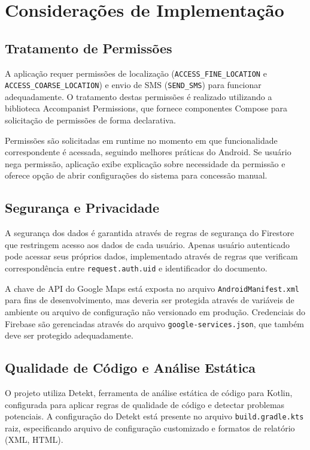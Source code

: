 \section{Considerações de Implementação}
\subsection{Tratamento de Permissões}
A aplicação requer permissões de localização (\texttt{ACCESS\_FINE\_LOCATION} e \texttt{ACCESS\_COARSE\_LOCATION}) e envio de SMS (\texttt{SEND\_SMS}) para funcionar adequadamente. O tratamento destas permissões é realizado utilizando a biblioteca Accompanist Permissions, que fornece componentes Compose para solicitação de permissões de forma declarativa.

Permissões são solicitadas em runtime no momento em que funcionalidade correspondente é acessada, seguindo melhores práticas do Android. Se usuário nega permissão, aplicação exibe explicação sobre necessidade da permissão e oferece opção de abrir configurações do sistema para concessão manual.

\subsection{Segurança e Privacidade}
A segurança dos dados é garantida através de regras de segurança do Firestore que restringem acesso aos dados de cada usuário. Apenas usuário autenticado pode acessar seus próprios dados, implementado através de regras que verificam correspondência entre \texttt{request.auth.uid} e identificador do documento.

A chave de API do Google Maps está exposta no arquivo \texttt{AndroidManifest.xml} para fins de desenvolvimento, mas deveria ser protegida através de variáveis de ambiente ou arquivo de configuração não versionado em produção. Credenciais do Firebase são gerenciadas através do arquivo \texttt{google-services.json}, que também deve ser protegido adequadamente.

\subsection{Qualidade de Código e Análise Estática}
O projeto utiliza Detekt, ferramenta de análise estática de código para Kotlin, configurada para aplicar regras de qualidade de código e detectar problemas potenciais. A configuração do Detekt está presente no arquivo \texttt{build.gradle.kts} raiz, especificando arquivo de configuração customizado e formatos de relatório (XML, HTML).

